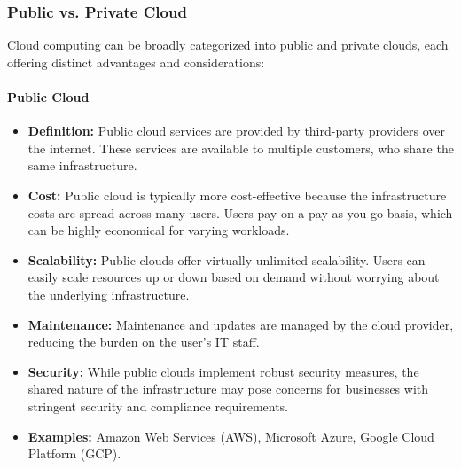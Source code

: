 \documentclass[a4paper,12pt]{report}
\begin{document}
\subsubsection{Public vs. Private Cloud}
Cloud computing can be broadly categorized into public and private clouds, each offering distinct advantages and considerations:

\paragraph{Public Cloud}
\begin{itemize}
	\item \textbf{Definition:} Public cloud services are provided by third-party providers over the internet. These services are available to multiple customers, who share the same infrastructure.
	\item \textbf{Cost:} Public cloud is typically more cost-effective because the infrastructure costs are spread across many users. Users pay on a pay-as-you-go basis, which can be highly economical for varying workloads.
	\item \textbf{Scalability:} Public clouds offer virtually unlimited scalability. Users can easily scale resources up or down based on demand without worrying about the underlying infrastructure.
	\item \textbf{Maintenance:} Maintenance and updates are managed by the cloud provider, reducing the burden on the user's IT staff.
	\item \textbf{Security:} While public clouds implement robust security measures, the shared nature of the infrastructure may pose concerns for businesses with stringent security and compliance requirements.
	\item \textbf{Examples:} Amazon Web Services (AWS), Microsoft Azure, Google Cloud Platform (GCP).
\end{itemize}
\end{document}

